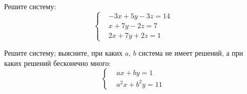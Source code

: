 %
%



\begin{problems}

\item
Решите систему:
\[ \left\{\begin{aligned}&
    - 3 x + 5 y - 3 z = 14
\\&
    x + 7 y - 2 z = 7
\\&
    2 x + 7 y + 2 z = 1
\end{aligned}\right.\]

\item
Решите систему; выясните, при каких $a$, $b$ система не имеет решений, а при
каких решений бесконечно много:
\[\left\{\begin{aligned}&
    a x + b y = 1
\\&
    a^2 x + b^2 y = 11
\end{aligned}\right.\]

\end{problems}

